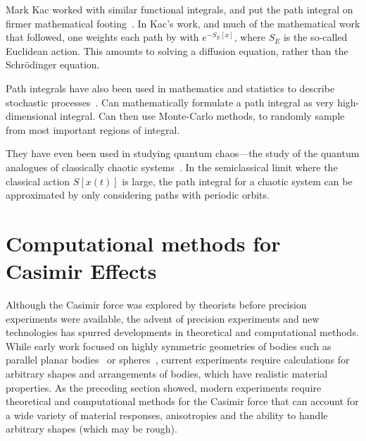     Mark Kac worked with similar functional integrals, and put the path integral 
    on firmer mathematical footing~\cite{Kac1949}.  In Kac's work, and much of the mathematical
    work that followed, one weights each path
    by with $e^{-S_E[x]}$, where $S_E$ is the so-called Euclidean action.  
    This amounts to solving a diffusion equation, rather than the Schr\"odinger equation.  

    Path integrals have also been used in mathematics and statistics to describe stochastic 
    processes~\cite{Durrett1996, Karatzas1991}.  
    Can mathematically formulate a path integral as very high-dimensional integral.
    Can then use Monte-Carlo methods, to randomly sample from most important regions of integral.  

    They have even been used in studying quantum chaos---the study of the quantum analogues 
    of classically chaotic systems~\cite{Gutzwiller1990}.  In the semiclassical limit
    where the classical action $S[x(t)]$ is large, the path integral for a chaotic system
    can be approximated by only considering paths with periodic orbits.  

    



\section{Computational methods for Casimir Effects}
\label{sec:numerical_review}

Although the Casimir force was explored by theorists before precision experiments were available,
the advent of precision experiments and new technologies has spurred developments in 
theoretical and computational methods.
While early work focused on highly symmetric geometries 
of bodies such as parallel planar bodies~\cite{Casimir1948} or spheres~\cite{Boyer1968}, 
current experiments require calculations for arbitrary shapes and arrangements of bodies, 
which have realistic material properties.  
As the preceding section showed, modern experiments require theoretical and computational methods
for the Casimir force that can account for a wide variety of material responses, anisotropies
and the ability to handle arbitrary shapes (which may be rough).  

